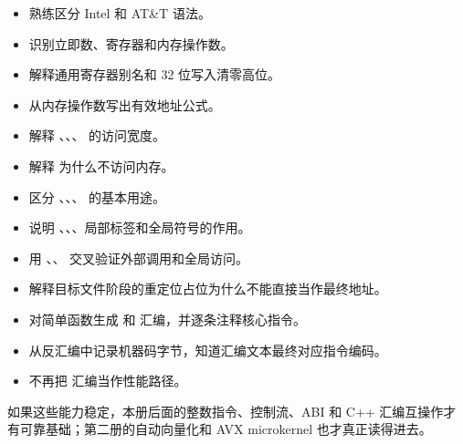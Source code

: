 \begin{itemize}
  \item 熟练区分 Intel 和 AT\&T 语法。
  \item 识别立即数、寄存器和内存操作数。
  \item 解释通用寄存器别名和 32 位写入清零高位。
  \item 从内存操作数写出有效地址公式。
  \item 解释 、、、 的访问宽度。
  \item 解释  为什么不访问内存。
  \item 区分 、、、 的基本用途。
  \item 说明 、、、局部标签和全局符号的作用。
  \item 用 、、 交叉验证外部调用和全局访问。
  \item 解释目标文件阶段的重定位占位为什么不能直接当作最终地址。
  \item 对简单函数生成  和  汇编，并逐条注释核心指令。
  \item 从反汇编中记录机器码字节，知道汇编文本最终对应指令编码。
  \item 不再把  汇编当作性能路径。
\end{itemize}

如果这些能力稳定，本册后面的整数指令、控制流、ABI 和 C++ 汇编互操作才有可靠基础；第二册的自动向量化和 AVX microkernel 也才真正读得进去。
